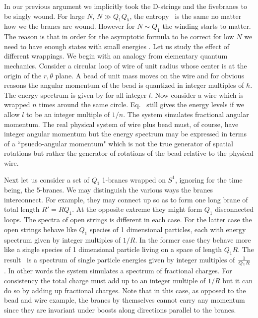 In our previous argument we implicitly  took
the D-strings and the 
fivebranes to be singly wound.
For large $N$, $N \gg Q_1 Q_5 $,  the entropy \entropyd\ is the
same no matter  how we  the branes are wound. 
However for $ N \sim Q_1 $ the winding starts to matter.
The reason is that in order for the asymptotic 
formula to be correct for low $N$ we need to have
enough states with small energies \sm . 
Let us study the effect of different wrappings.
We begin with an
analogy from
elementary quantum mechanics. Consider a circular loop of wire of unit
radius
whose center is at the origin of the $r,\theta$ plane. A bead of unit mass
moves
on the wire and for obvious reasons the angular momentum of the bead is
quantized
in integer multiples of
$\hbar$. The energy spectrum is given by
%
\eqn{}
%
for all integer $l$.
 Now consider a wire which is wrapped $n$ times around the same circle.
Eq.
\qm\
 still gives the energy levels if we allow $l$ to be an integer multiple
of
$1/n$. The system simulates fractional angular momentum. The real physical
system
of wire plus bead must, of course, have integer angular momentum but the
energy
spectrum may be expressed in terms of a
``psuedo-angular momentum" which is
not
the true generator of spatial rotations but rather the generator of
rotations
of
the bead relative to the physical wire.

Next let us consider a set of $Q_1$  1-branes wrapped on $S^1$, ignoring for
the
time being, the 5-branes. We may distinguish the
various ways
the branes interconnect. For example,
 they may connect up so as to form one
long
brane of total length $R'= R Q_1$. At the opposite extreme they might
form $Q_1$ disconnected loops. The spectra of open strings is different in
each
case. For the latter case the open strings behave like $Q_1$ species of
1 dimensional particles, each  with energy spectrum given by integer
multiples of
$1/R$. In the former case they behave more like a single species of 1
dimensional
particle living on a space of length $Q_1 R$. The result  \dasmathur\
 is a
 spectrum
of
single
particle energies given by integer multiples of $1\over{Q_1 R}$  .
 In other
words
the system simulates a spectrum of   fractional charges. For consistency the
total
charge must add up to an integer multiple of $1/R$ but it can do so by
adding
up
fractional charges. Note that in this case, as opposed to the
bead and wire example, the branes by themselves cannot carry any
momentum since they are invariant under boosts along directions
parallel to the branes.


